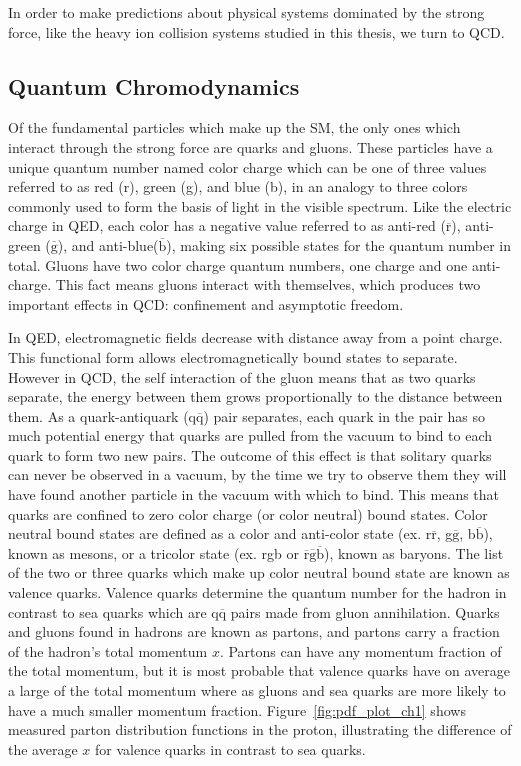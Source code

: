 In order to make predictions about physical systems dominated by the strong force, like the heavy ion collision systems studied in this thesis, we turn to QCD. 

\subsection{Quantum Chromodynamics}
Of the fundamental particles which make up the SM, the only ones  which interact through the strong force are quarks and gluons. 
These particles have a unique quantum number named color charge which can be one of three values referred to as
red (r), green (g), and blue (b), in an analogy to three colors commonly used to form the basis of light in the visible spectrum. Like the electric
charge in QED, each color has a negative value referred to as anti-red ($\overline{\text{r}}$), anti-green ($\overline{\text{g}}$), and anti-blue($\overline{\text{b}}$), making six possible states for the quantum number in total. Gluons have two color charge quantum numbers, one charge and one anti-charge. This fact means gluons interact with themselves, which produces two important effects in QCD: confinement and asymptotic freedom.

In QED, electromagnetic fields decrease with distance away from a point charge. This functional form allows electromagnetically bound states to separate.
However in QCD, the self interaction of the gluon means that as two quarks separate, the energy between them grows proportionally to the distance between them. As a
quark-antiquark (q$\overline{\text{q}}$) pair separates, each quark in the pair has so much potential energy that quarks are pulled from the vacuum to bind to each quark to form two new pairs. The outcome of this effect is that solitary quarks can never be observed in a vacuum, by the time we try to observe them they will have found another particle in the vacuum with which to bind. This means that quarks are confined to zero color charge (or color neutral) bound states. Color neutral bound states are defined as a color and anti-color state  (ex. r$\overline{\text{r}}$, g$\overline{\text{g}}$, b$\overline{\text{b}}$),  known as mesons, or a tricolor state (ex. rgb or $\overline{\text{r}}\overline{\text{g}}\overline{\text{b}}$), known as baryons. The list of the two or three quarks which make up color neutral bound state are known as valence quarks. Valence quarks determine the quantum number for the hadron in contrast to sea quarks which are q$\overline{\text{q}}$ pairs made from gluon annihilation. Quarks and gluons found in hadrons are known as partons, and partons carry a fraction of the hadron's total momentum $x$. Partons can have any momentum fraction of the total momentum, but it is most probable that valence quarks have on average a large of the total momentum where as gluons and sea quarks are more likely to have a much smaller momentum fraction. Figure~\ref{fig:pdf_plot_ch1} shows measured parton distribution functions in the proton, illustrating the difference of the average $x$ for valence quarks in contrast to sea quarks.

